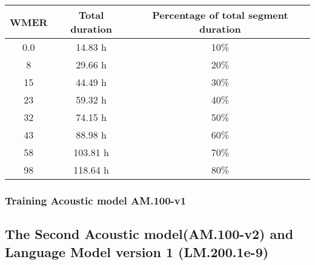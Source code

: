 \begin{center}
\label{wmerAM0s1}
\begin{tabular}{ | c | c | c | }
\hline
\textbf{WMER} & \textbf{Total duration} & \textbf{Percentage of total segment duration}  \\ \hline \hline
0.0 & 14.83 h & 10\% \\ \hline
8 & 29.66 h & 20\% \\ \hline
15 & 44.49 h & 30\% \\ \hline
23 & 59.32 h & 40\% \\ \hline
32 &  74.15 h & 50\% \\ \hline
43 & 88.98 h & 60\% \\ \hline
58 & 103.81 h & 70\% \\ \hline
98 & 118.64 h & 80\% \\ \hline
\end{tabular}
\end{center}

\subsubsection{Training Acoustic model AM.100-v1}





\subsection{The Second Acoustic model(AM.100-v2) and Language Model version 1 (LM.200.1e-9)}



